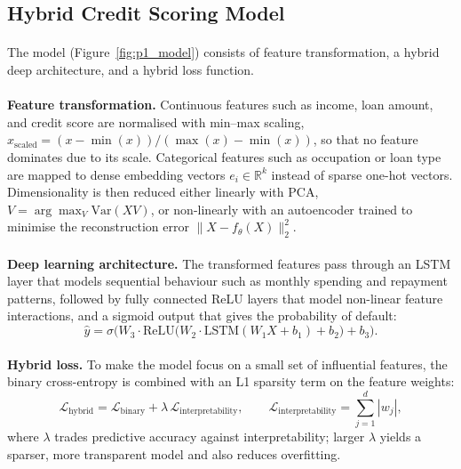 \documentclass[12pt,a4paper,final]{extreport}
\begin{document}
\subsection{Hybrid Credit Scoring Model}

\paragraph{} The model (Figure~\ref{fig:p1_model}) consists of feature transformation, a hybrid deep architecture, and a hybrid loss function.

\paragraph{} \textbf{Feature transformation.} Continuous features such as income, loan amount, and credit score are normalised with min--max scaling, $x_{\mathrm{scaled}}=(x-\min(x))/(\max(x)-\min(x))$, so that no feature dominates due to its scale. Categorical features such as occupation or loan type are mapped to dense embedding vectors $e_i\in\mathbb{R}^{k}$ instead of sparse one-hot vectors. Dimensionality is then reduced either linearly with PCA, $V=\arg\max_V \mathrm{Var}(XV)$, or non-linearly with an autoencoder trained to minimise the reconstruction error $\|X-f_\theta(X)\|_2^2$.

\paragraph{} \textbf{Deep learning architecture.} The transformed features pass through an LSTM layer that models sequential behaviour such as monthly spending and repayment patterns, followed by fully connected ReLU layers that model non-linear feature interactions, and a sigmoid output that gives the probability of default:
\begin{equation}
\hat{y}=\sigma\Big(W_3\cdot\mathrm{ReLU}\big(W_2\cdot\mathrm{LSTM}(W_1X+b_1)+b_2\big)+b_3\Big).
\end{equation}

\paragraph{} \textbf{Hybrid loss.} To make the model focus on a small set of influential features, the binary cross-entropy is combined with an L1 sparsity term on the feature weights:
\begin{equation}
\mathcal{L}_{\mathrm{hybrid}}=\mathcal{L}_{\mathrm{binary}}+\lambda\,\mathcal{L}_{\mathrm{interpretability}},\qquad \mathcal{L}_{\mathrm{interpretability}}=\sum_{j=1}^{d}|w_j|,
\end{equation}
where $\lambda$ trades predictive accuracy against interpretability; larger $\lambda$ yields a sparser, more transparent model and also reduces overfitting.
\end{document}
